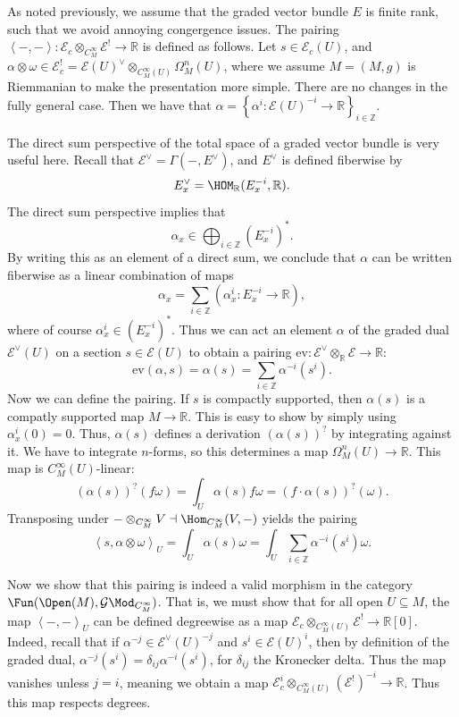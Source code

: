 \begin{remark}\label{rmk:4.3.2}
	As noted previously, we assume that the graded vector bundle $E$ is finite rank, such that we avoid annoying congergence issues. The pairing $\left\langle -,- \right\rangle : \mathcal{E} _c\otimes_{C^\infty _M} \mathcal{E} ^!\to \mathbb{R} $ is defined as follows. Let $s\in \mathcal{E} _c(U)$, and $\alpha \otimes \omega \in \mathcal{E} _c^! = \mathcal{E} (U)^\vee \otimes_{C^\infty_M(U)} \Omega _M^n(U)$, where we assume $M=(M,g)$ is Riemmanian to make the presentation more simple. There are no changes in the fully general case. Then we have that $\alpha =\left\{ \alpha ^i : \mathcal{E} (U)^{-i}  \to \mathbb{R}  \right\}_{i\in\mathbb{Z} } $.

	The direct sum perspective of the total space of a graded vector bundle is very useful here. Recall that $\mathcal{E} ^\vee =\Gamma (-,E^\vee )$, and $E^\vee $ is defined fiberwise by
	\[
		E^\vee_x=\HOM_{\mathbb{R} }(E^{-i}_x, \mathbb{R} ) 
	.\]
	The direct sum perspective implies that
	\[
		\alpha_x \in \bigoplus_{i\in\mathbb{Z} } (E^{-i}_x)^* 
	.\]
	By writing this as an element of a direct sum, we conclude that $\alpha $ can be written fiberwise as a linear combination of maps
	\[
		\alpha_x =\sum_{i\in\mathbb{Z} } \left( \alpha ^i_x : E^{-i}_x \to \mathbb{R}  \right) 
	,\]
	where of course $\alpha ^i_x\in (E^{-i} _x)^*$. Thus we can act an element $\alpha $ of the graded dual $\mathcal{E} ^\vee (U)$ on a section $s\in \mathcal{E} (U)$ to obtain a pairing $\mathrm{ev} : \mathcal{E} ^\vee \otimes_{\mathbb{R} } \mathcal{E}  \to \mathbb{R} $:
	\[
		\mathrm{ev} (\alpha ,s) = \alpha (s) = \sum_{i\in\mathbb{Z} } \alpha ^{-i} (s^i)
	.\]
	Now we can define the pairing. If $s$ is compactly supported, then $\alpha (s)$ is a compatly supported map $M\to \mathbb{R} $. This is easy to show by simply using $\alpha ^i_x(0)=0$. Thus, $\alpha (s)$ defines a derivation $(\alpha (s))^?$ by integrating against it. We have to integrate $n$-forms, so this determines a map $\Omega _M^n(U)\to \mathbb{R} $. This map is $C^\infty _M(U)$-linear:
	\[
		(\alpha (s))^?(f\omega) = \int_{U} \alpha (s)f\omega =(f\cdot \alpha (s))^?(\omega )
	.\]
	Transposing under $-\otimes_{C^\infty _M}V \dashv \Hom_{C^\infty _M}(V, -) $ yields the pairing
	\[
		\left\langle s,\alpha \otimes \omega  \right\rangle_U = \int_{U} \alpha (s)\omega =\int_{U} \sum_{i\in\mathbb{Z} } \alpha ^{-i} (s^i)\omega 
	.\]
	
	Now we show that this pairing is indeed a valid morphism in the category $\Fun(\Open(M) , \mathcal{G} \Mod_{C^\infty _M} ) $. That is, we must show that for all open $U\subseteq M$, the map $\left\langle -,- \right\rangle _U$ can be defined degreewise as a map $\mathcal{E} _c\otimes _{C^\infty _M(U)} \mathcal{E} ^! \to \mathbb{R} [0]$. Indeed, recall that if $\alpha ^{-j} \in \mathcal{E} ^\vee (U)^{-j} $ and $s^i\in \mathcal{E} (U)^i$, then by definition of the graded dual, $\alpha ^{-j} (s^i) = \delta _{ij} \alpha ^{-i} (s^i)$, for $\delta _{ij} $ the Kronecker delta. Thus the map vanishes unless $j=i$, meaning we obtain a map $\mathcal{E} _c^i\otimes _{C^\infty _M(U)} (\mathcal{E} ^!)^{-i} \to \mathbb{R}$. Thus this map respects degrees.



\end{remark}
